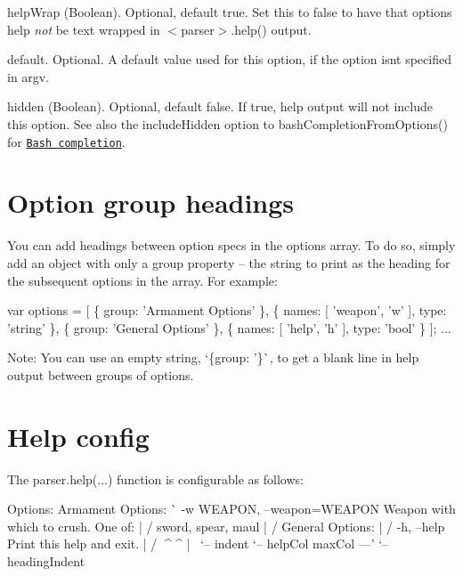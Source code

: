 \begin{DoxyItemize}
\item {\ttfamily help\+Wrap} (Boolean). Optional, default true. Set this to {\ttfamily false} to have that option\textquotesingle{}s {\ttfamily help} {\itshape not} be text wrapped in {\ttfamily $<$parser$>$.help()} output.
\item {\ttfamily default}. Optional. A default value used for this option, if the option isn\textquotesingle{}t specified in argv.
\item {\ttfamily hidden} (Boolean). Optional, default false. If true, help output will not include this option. See also the {\ttfamily include\+Hidden} option to {\ttfamily bash\+Completion\+From\+Options()} for \href{#bash-completion}{\tt Bash completion}.
\end{DoxyItemize}

\section*{Option group headings}

You can add headings between option specs in the {\ttfamily options} array. To do so, simply add an object with only a {\ttfamily group} property -- the string to print as the heading for the subsequent options in the array. For example\+:


\begin{DoxyCode}
var options = [
    \{
        group: 'Armament Options'
    \},
    \{
        names: [ 'weapon', 'w' ],
        type: 'string'
    \},
    \{
        group: 'General Options'
    \},
    \{
        names: [ 'help', 'h' ],
        type: 'bool'
    \}
];
...
\end{DoxyCode}


Note\+: You can use an empty string, `\{group\+: '\textquotesingle{}\}\`{}, to get a blank line in help output between groups of options.

\section*{Help config}

The {\ttfamily parser.\+help(...)} function is configurable as follows\+: \begin{DoxyVerb}    Options:
      Armament Options:
    ^^  -w WEAPON, --weapon=WEAPON  Weapon with which to crush. One of: |
   /                                sword, spear, maul                  |
  /   General Options:                                                  |
 /      -h, --help                  Print this help and exit.           |
/   ^^^^                            ^                                   |
\       `-- indent                   `-- helpCol              maxCol ---'
 `-- headingIndent
\end{DoxyVerb}



